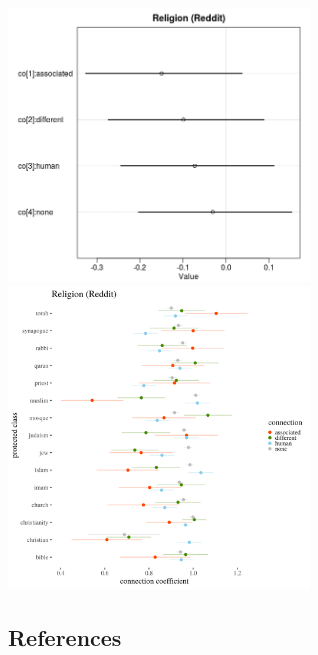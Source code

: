\documentclass[
  12pt,
  dvipsnames,enabledeprecatedfontcommands]{scrartcl}
\begin{document}
\includegraphics[width=8cm]{../images/religionCoeffs.jpeg}
\includegraphics[width=8cm]{../images/visReligionReddit.png}

\pagebreak

\hypertarget{references}{%
\subsection*{References}\label{references}}

\scriptsize
\end{document}
